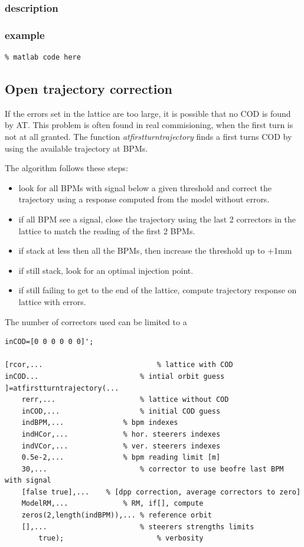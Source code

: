 \subsubsection*{description}
\subsubsection*{example}
\begin{lstlisting}
% matlab code here
\end{lstlisting}

\subsection{Open trajectory correction}
If the errors set in the lattice are too large, it is possible that no COD is found by AT. This problem is often found in real commisioning, when the first turn is not at all granted. The function \emph{atfirstturntrajectory} finds a first turns COD by using the available trajectory at BPMs. 

The algorithm follows these steps:
\begin{itemize}
\item look for all BPMs with signal below a given threshold and correct the trajectory using a response computed from the model without errors. 
\item if all BPM see a signal, close the trajectory using the last 2 correctors in the lattice to match the reading of the first 2 BPMs.
\item if stack at less then all the BPMs, then increase the threshold up to +1mm
\item if still stack, look for an optimal injection point.
\item if still failing to get to the end of the lattice, compute trajectory response on lattice with errors. 
\end{itemize}
The number of correctors used can be limited to a  

\begin{lstlisting}
inCOD=[0 0 0 0 0 0]';

[rcor,...							% lattice with COD
inCOD...  						% intial orbit guess
]=atfirstturntrajectory(...
    rerr,...					% lattice without COD
    inCOD,...					% initial COD guess
    indBPM,...				% bpm indexes
    indHCor,...				% hor. steerers indexes
    indVCor,...				% ver. steerers indexes
    0.5e-2,...				% bpm reading limit [m]
    30,...						% corrector to use beofre last BPM with signal
    [false true],...	% [dpp correction, average correctors to zero]	
    ModelRM,...				% RM, if[], compute
    zeros(2,length(indBPM)),...	% reference orbit
    [],...						% steerers strengths limits
		true);						% verbosity	
		
\end{lstlisting}


